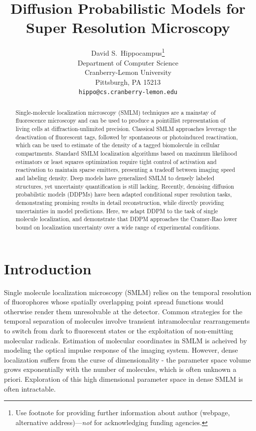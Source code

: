 \documentclass{article}
\title{Diffusion Probabilistic Models for Super Resolution Microscopy}
\author{%
  David S.~Hippocampus\thanks{Use footnote for providing further information
    about author (webpage, alternative address)---\emph{not} for acknowledging
    funding agencies.} \\
  Department of Computer Science\\
  Cranberry-Lemon University\\
  Pittsburgh, PA 15213 \\
  \texttt{hippo@cs.cranberry-lemon.edu} \\
}
\begin{document}
\maketitle


\begin{abstract}
Single-molecule localization microscopy (SMLM) techniques are a mainstay of fluorescence microscopy and can be used to produce a pointillist representation of living cells at diffraction-unlimited precision. Classical SMLM approaches leverage the deactivation of fluorescent tags, followed by spontaneous or photoinduced reactivation, which can be used to estimate of the density of a tagged biomolecule in cellular compartments. Standard SMLM localization algorithms based on maximum likelihood estimators or least squares optimization require tight control of activation and reactivation to maintain sparse emitters, presenting a tradeoff between imaging speed and labeling density. Deep models have generalized SMLM to densely labeled structures, yet uncertainty quantification is still lacking. Recently, denoising diffusion probabilstic models (DDPMs) have been adapted conditional super resolution tasks, demonstrating promising results in detail reconstruction, while directly providing uncertainties in model predictions. Here, we adapt DDPM to the task of single molecule localization, and demonstrate that DDPM approaches the Cramer-Rao lower bound on localization uncertainty over a wide range of experimental conditions.
\end{abstract}

\section{Introduction}
Single molecule localization microscopy (SMLM) relies on the temporal resolution of fluorophores whose spatially overlapping point spread functions would otherwise render them unresolvable at the detector. Common strategies for the temporal separation of molecules involve transient intramolecular rearrangements to switch from dark to fluorescent states or the exploitation of non-emitting molecular radicals. Estimation of molecular coordinates in SMLM is acheived by modeling the optical impulse response of the imaging system. However, dense localization suffers from the curse of dimensionality - the parameter space volume grows exponentially with the number of molecules, which is often unknown a priori. Exploration of this high dimensional parameter space in dense SMLM is often intractable. 
\end{document}
